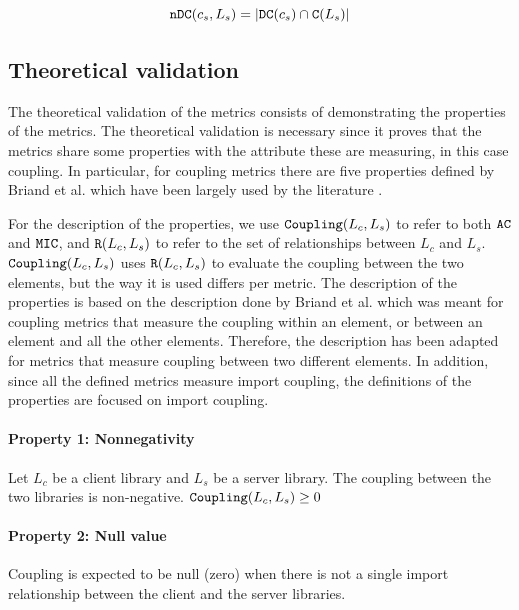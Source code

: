 \begin{equation}
\label{eqn:ac-ndc}
    \verb|nDC|(c_s, L_s) = |\verb|DC|(c_s) \cap \verb|C|(L_s)|
\end{equation}

\subsection{Theoretical validation}
The theoretical validation of the metrics consists of demonstrating the properties of the metrics. The theoretical validation is necessary since it proves that the metrics share some properties with the attribute these are measuring, in this case coupling. In particular, for coupling metrics there are five properties defined by Briand et al. \cite{briand1996property} which have been largely used by the literature \cite{poshyvanyk2006conceptual, allen1999measuring, zhao2004measuring}.

For the description of the properties, we use $\verb|Coupling|(L_c, L_s)$ to refer to both $\verb|AC|$ and $\verb|MIC|$, and $\verb|R|(L_c, L_s)$ to refer to the set of relationships between $L_c$ and $L_s$. $\verb|Coupling|(L_c, L_s)$ uses $\verb|R|(L_c, L_s)$ to evaluate the coupling between the two elements, but the way it is used differs per metric. The description of the properties is based on the description done by Briand et al. \cite{briand1996property} which was meant for coupling metrics that measure the coupling within an element, or between an element and all the other elements. Therefore, the description has been adapted for metrics that measure coupling between two different elements. In addition, since all the defined metrics measure import coupling, the definitions of the properties are focused on import coupling.

\paragraph{Property 1: Nonnegativity}

Let $L_c$ be a client library and $L_s$ be a server library. The coupling between the two libraries is non-negative. $\verb|Coupling|(L_c, L_s) \ge 0$

\paragraph{Property 2: Null value}
Coupling is expected to be null (zero) when there is not a single import relationship between the client and the server libraries.

